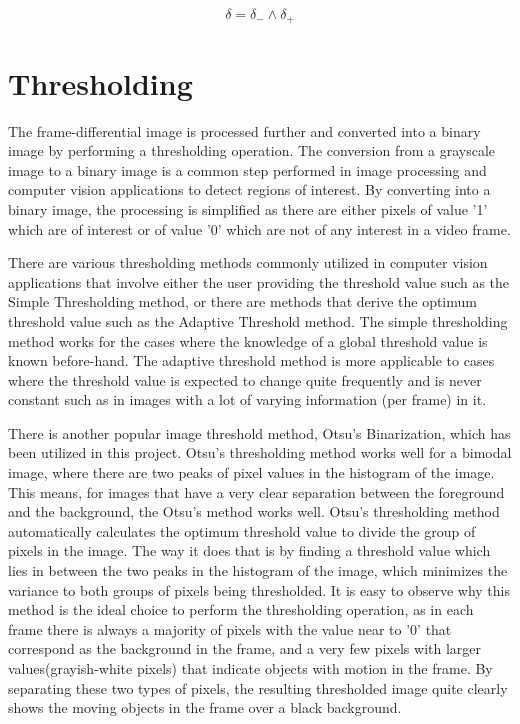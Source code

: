 \documentclass[a4paper]{article}
\begin{document}
\begin{equation} \label{eq:framediff}
    \delta = \delta_- \wedge \delta_+
\end{equation}
\newpage

\section{Thresholding}
The frame-differential image is processed further and converted into a binary image by performing a thresholding operation. The conversion from a grayscale image to a binary image is a common step performed in image processing and computer vision applications to detect regions of interest. By converting into a binary image, the processing is simplified as there are either pixels of value '1' which are of interest or of value '0' which are not of any interest in a video frame. \par
There are various thresholding methods commonly utilized in computer vision applications that involve either the user providing the threshold value such as the Simple Thresholding method, or there are methods that derive the optimum threshold value such as the Adaptive Threshold method. The simple thresholding method works for the cases where  the knowledge of a global threshold value is known before-hand. The adaptive threshold method is more applicable to cases where the threshold value is expected to change quite frequently and is never constant such as in images with a lot of varying information (per frame) in it. \par 
There is another popular image threshold method, Otsu's Binarization, which has been utilized in this project. Otsu's thresholding method works well for a bimodal image, where there are two peaks of pixel values in the histogram of the image. This means, for images that have a very clear separation between the foreground and the background, the Otsu's method works well. Otsu's thresholding method automatically calculates the optimum threshold value to divide the group of pixels in the image. The way it does that is by finding a threshold value which lies in between the two peaks in the histogram of the image, which minimizes the variance to both groups of pixels being thresholded. It is easy to observe why this method is the ideal choice to perform the thresholding operation, as in each frame there is always a majority of pixels with the value near to '0' that correspond as the background in the frame, and a very few pixels with larger values(grayish-white pixels) that indicate objects with motion in the frame. By separating these two types of pixels, the resulting thresholded image quite clearly shows the moving objects in the frame over a black background. \par
\newpage
\end{document}

